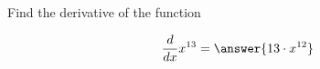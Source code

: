 \documentclass{ximera}
\begin{document}
\begin{exercise}


Find the derivative of the function

\[
\dfrac{d}{dx}x^{13} =\answer{13 \cdot x^{12}}
\]


\end{exercise}

\begin{comment}
Exercises I

Differentiate the following:

\begin{question}

<p>(1) $y = x^{13}$
<p>(2) $y = x^{-\frac{3}{2}}$
<p>(3) $y = x^{2a}$
<p>(4) $u = t^{2.4}$
<p>(5) $z = \sqrt[3]{u}$
<p>(6) $y = \sqrt[3]{x^{-5}}$
<p>(7) $u = \sqrt[5]{\dfrac{1}{x^8}}$
<p>(8) $y = 2x^a$
<p>(9) $y = \sqrt[q]{x^3}$
<p>(10) $y = \sqrt[n]{\dfrac{1}{x^m}}$


<p><em>You have now learned how to differentiate powers
of $x$. How easy it is!</em>

<h3 class="answers">Answers</h3>
<p>(1)   $\dfrac{dy}{dx} = 13x^{12}$.
<p>(2)   $\dfrac{dy}{dx} = - \dfrac{3}{2} x^{-\frac{5}{2}}$.
<p>(3)   $\dfrac{dy}{dx} = 2ax^{(2a-1)}$.
<p>(4)   $\dfrac{du}{dt} = 2.4t^{1.4}$.
<p>(5)   $\dfrac{dz}{du} = \dfrac{1}{3} u^{-\frac{2}{3}}$.
<p>(6)   $\dfrac{dy}{dx} = -\dfrac{5}{3}x^{-\frac{8}{3}}$.
<p>(7)   $\dfrac{du}{dx} = -\dfrac{8}{5}x^{-\frac{13}{5}}$.
<p>(8)   $\dfrac{dy}{dx} = 2ax^{a-1}$.
<p>(9)   $\dfrac{dy}{dx} = \dfrac{3}{q} x^{\frac{3-q}{q}}$.
<p>(10)   $\dfrac{dy}{dx} = -\dfrac{m}{n} x^{-\frac{m+n}{n}}$.
<br>
<hr>
\end{comment}
\end{document}
